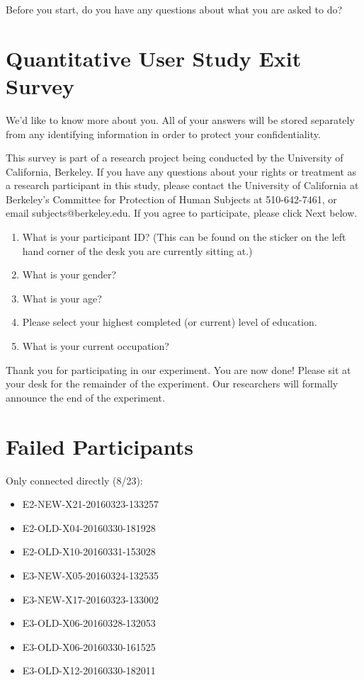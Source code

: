 \documentclass[USenglish,oneside,twocolumn]{article}
\begin{document}
Before you start, do you have any questions about what you are asked to do? 

\section{Quantitative User Study Exit Survey} 
\label{quantitative-exit-survey}
We'd like to know more about you.  All of your answers will be stored separately from any identifying information in order to protect your confidentiality.

This survey is part of a research project being conducted by the University of California, Berkeley. If you have any questions about your rights or treatment as a research participant in this study, please contact the University of California at Berkeley's Committee for Protection of Human Subjects at 510-642-7461, or email subjects@berkeley.edu. If you agree to participate, please click Next below.\\

\begin{enumerate}
\item{What is your participant ID? (This can be found on the sticker on the left hand corner of the desk you are currently sitting at.)}
\item{What is your gender?}
\item{What is your age?}
\item{Please select your highest completed (or current) level of education}.
\item{What is your current occupation?}  
\end{enumerate}

Thank you for participating in our experiment. You are now done! Please sit at your desk for the remainder of the experiment. Our researchers will formally announce the end of the experiment. 

\section{Failed Participants} 
\label{failed-participants}

Only connected directly (8/23): 
\begin{itemize}
\item E2-NEW-X21-20160323-133257 
\item E2-OLD-X04-20160330-181928
\item E2-OLD-X10-20160331-153028
\item E3-NEW-X05-20160324-132535
\item E3-NEW-X17-20160323-133002
\item E3-OLD-X06-20160328-132053
\item E3-OLD-X06-20160330-161525 
\item E3-OLD-X12-20160330-182011
\end{itemize} 
\end{document}
